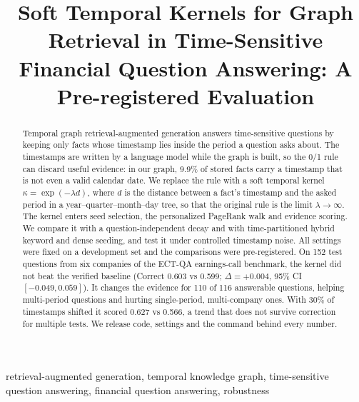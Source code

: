 \documentclass[conference]{IEEEtran}
\begin{document}
\title{Soft Temporal Kernels for Graph Retrieval in Time-Sensitive Financial Question Answering: A Pre-registered Evaluation}

\author{
}

\maketitle

\begin{abstract}
Temporal graph retrieval-augmented generation answers time-sensitive questions by keeping only facts whose timestamp lies inside the period a question asks about. The timestamps are written by a language model while the graph is built, so the 0/1 rule can discard useful evidence: in our graph, 9.9\% of stored facts carry a timestamp that is not even a valid calendar date. We replace the rule with a soft temporal kernel $\kappa = \exp(-\lambda d)$, where $d$ is the distance between a fact's timestamp and the asked period in a year--quarter--month--day tree, so that the original rule is the limit $\lambda \to \infty$. The kernel enters seed selection, the personalized PageRank walk and evidence scoring. We compare it with a question-independent decay and with time-partitioned hybrid keyword and dense seeding, and test it under controlled timestamp noise. All settings were fixed on a development set and the comparisons were pre-registered. On 152 test questions from six companies of the ECT-QA earnings-call benchmark, the kernel did not beat the verified baseline (Correct 0.603 vs 0.599; $\Delta = +0.004$, 95\% CI $[-0.049, 0.059]$). It changes the evidence for 110 of 116 answerable questions, helping multi-period questions and hurting single-period, multi-company ones. With 30\% of timestamps shifted it scored 0.627 vs 0.566, a trend that does not survive correction for multiple tests. We release code, settings and the command behind every number.
\end{abstract}

\begin{IEEEkeywords}
retrieval-augmented generation, temporal knowledge graph, time-sensitive question answering, financial question answering, robustness
\end{IEEEkeywords}



\end{document}

